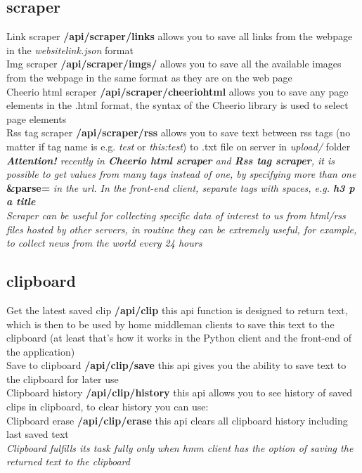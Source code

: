 \documentclass{article}
\begin{document}
\subsection{scraper}
Link scraper \textbf{/api/scraper/links} allows you to save all links from the webpage in the \textit{websitelink.json} format\\
Img scraper \textbf{/api/scraper/imgs/} allows you to save all the available images from the webpage in the same format as they are on the web page\\
Cheerio html scraper \textbf{/api/scraper/cheeriohtml} allows you to save any page elements in the .html format, the syntax of the Cheerio library is used to select page elements\\
Rss tag scraper \textbf{/api/scraper/rss} allows you to save text between rss tags (no matter if tag name is e.g. \textit{test} or \textit{this:test}) to .txt file on server in \textit{upload/} folder\\
\textit{\textbf{Attention!} recently in \textbf{Cheerio html scraper} and \textbf{Rss tag scraper}, it is possible to get values from many tags instead of one, by specifying more than one }\textbf{\&parse=}\textit{ in the url. In the front-end client, separate tags with spaces, e.g. \textbf{h3 p a title}}\\
\textit{Scraper can be useful for collecting specific data of interest to us from html/rss files hosted by other servers, in routine they can be extremely useful, for example, to collect news from the world every 24 hours}
\subsection{clipboard}
Get the latest saved clip \textbf{/api/clip} this api function is designed to return text, which is then to be used by home middleman clients to save this text to the clipboard (at least that's how it works in the Python client and the front-end of the application)\\
Save to clipboard \textbf{/api/clip/save} this api gives you the ability to save text to the clipboard for later use\\
Clipboard history \textbf{/api/clip/history} this api allows you to see history of saved clips in clipboard, to clear history you can use:\\
Clipboard erase \textbf{/api/clip/erase} this api clears all clipboard history including last saved text\\
\textit{Clipboard fulfills its task fully only when hmm client has the option of saving the returned text to the clipboard}
\end{document}
